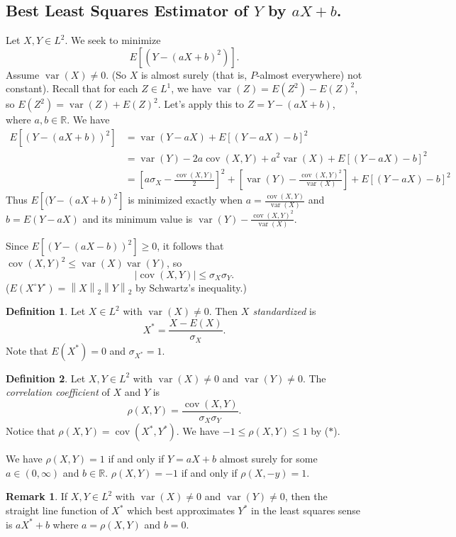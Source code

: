 \documentclass{article}
\newcommand{\R}{\mathbb{R}}
\DeclareMathOperator{\var}{var}
\DeclareMathOperator{\cov}{cov}
\newcommand{\norm}[1]{\left\lVert#1\right\rVert} %
\theoremstyle{definition}
\newtheorem*{definition}{Definition}
\newtheorem*{remark}{Remark}
\begin{document}
\subsection*{Best Least Squares Estimator of $Y$ by $aX+b$.}
Let $X, Y \in L^2$. We seek to minimize
\[
    E\left[(Y-(aX+b)^2)\right].
\]
Assume $\var(X) \neq 0$. (So $X$ is almost surely (that is, $P$-almost everywhere) not constant). Recall that for each $Z \in L^1$, we have $\var(Z) = E(Z^2)-E(Z)^2$, so $E(Z^2) = \var(Z)+E(Z)^2$. Let's apply this to $Z = Y-(aX+b)$, where $a, b \in \R$.
We have
\begin{align*}
    E[(Y-(aX+b))^2] &= \var(Y-aX) + E[(Y-aX)-b]^2 \\
        &= \var(Y) - 2a\cov(X,Y) + a^2\var(X) + E[(Y-aX)-b]^2 \\
        &= \left[ a\sigma_X - \frac{\cov(X,Y)}{2} \right]^2 + \left[ \var(Y) - \frac{\cov(X,Y)^2}{\var(X)} \right] + E[(Y-aX)-b]^2
\end{align*}
Thus $E[(Y-(aX+b)^2]$ is minimized exactly when $a = \frac{\cov(X,Y)}{\var(X)}$ and $b = E(Y-aX)$ and its minimum value is $\var(Y)-\frac{\cov(X,Y)^2}{\var(X)}$.

Since $E[(Y-(aX-b))^2] \geq 0$, it follows that $\cov(X,Y)^2 \leq \var(X)\var(Y)$, so
\begin{equation*}
    |\cov(X,Y)| \leq \sigma_X \sigma_Y. \tag{$*$}
\end{equation*}
($E(X^\circ Y^\circ) = \norm{X}_2 \norm{Y}_2$ by Schwartz's inequality.)

\begin{definition}
    Let $X \in L^2$ with $\var(X) \neq 0$. Then \emph{$X$ standardized} is
    \[
        X^* = \frac{X-E(X)}{\sigma_X}.
    \]
    Note that $E(X^*) = 0$ and $\sigma_{X^*} = 1$.
\end{definition}

\begin{definition}
    Let $X, Y \in L^2$ with $\var(X) \neq 0$ and $\var(Y) \neq 0$. The \emph{correlation coefficient} of $X$ and $Y$ is
    \[
        \rho(X,Y) = \frac{\cov(X,Y)}{\sigma_X \sigma_Y}.
    \]
    Notice that $\rho(X,Y) = \cov(X^*, Y^*)$. We have $-1 \leq \rho(X,Y) \leq 1$ by ($*$).
\end{definition}

We have $\rho(X,Y) = 1$ if and only if $Y = aX+b$ almost surely for some $a \in (0, \infty)$ and $b \in \R$. $\rho(X,Y) = -1$ if and only if $\rho(X,-y) = 1$.

\begin{remark}
     If $X,Y \in L^2$ with $\var(X) \neq 0$ and $\var(Y) \neq 0$, then the straight line function of $X^*$ which best approximates $Y^*$ in the least squares sense is $aX^* + b$ where $a = \rho(X,Y)$ and $b = 0$.
\end{remark}
\end{document}
